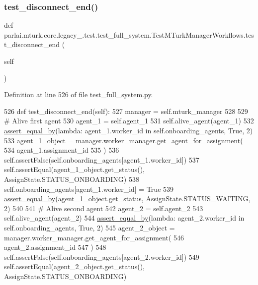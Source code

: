 \subsubsection{\texorpdfstring{test\+\_\+disconnect\+\_\+end()}{test\_disconnect\_end()}}
{\footnotesize\ttfamily def parlai.\+mturk.\+core.\+legacy\+\_.\+test.\+test\+\_\+full\+\_\+system.\+Test\+M\+Turk\+Manager\+Workflows.\+test\+\_\+disconnect\+\_\+end (\begin{DoxyParamCaption}\item[{}]{self }\end{DoxyParamCaption})}



Definition at line 526 of file test\+\_\+full\+\_\+system.\+py.


\begin{DoxyCode}
526     \textcolor{keyword}{def }test\_disconnect\_end(self):
527         manager = self.mturk\_manager
528 
529         \textcolor{comment}{# Alive first agent}
530         agent\_1 = self.agent\_1
531         self.alive\_agent(agent\_1)
532         \hyperlink{namespaceparlai_1_1mturk_1_1core_1_1test_1_1test__full__system_a0b463246d35658a2e422010f13dcf819}{assert\_equal\_by}(\textcolor{keyword}{lambda}: agent\_1.worker\_id \textcolor{keywordflow}{in} self.onboarding\_agents, \textcolor{keyword}{True}, 2)
533         agent\_1\_object = manager.worker\_manager.get\_agent\_for\_assignment(
534             agent\_1.assignment\_id
535         )
536         self.assertFalse(self.onboarding\_agents[agent\_1.worker\_id])
537         self.assertEqual(agent\_1\_object.get\_status(), AssignState.STATUS\_ONBOARDING)
538         self.onboarding\_agents[agent\_1.worker\_id] = \textcolor{keyword}{True}
539         \hyperlink{namespaceparlai_1_1mturk_1_1core_1_1test_1_1test__full__system_a0b463246d35658a2e422010f13dcf819}{assert\_equal\_by}(agent\_1\_object.get\_status, AssignState.STATUS\_WAITING, 2)
540 
541         \textcolor{comment}{# Alive second agent}
542         agent\_2 = self.agent\_2
543         self.alive\_agent(agent\_2)
544         \hyperlink{namespaceparlai_1_1mturk_1_1core_1_1test_1_1test__full__system_a0b463246d35658a2e422010f13dcf819}{assert\_equal\_by}(\textcolor{keyword}{lambda}: agent\_2.worker\_id \textcolor{keywordflow}{in} self.onboarding\_agents, \textcolor{keyword}{True}, 2)
545         agent\_2\_object = manager.worker\_manager.get\_agent\_for\_assignment(
546             agent\_2.assignment\_id
547         )
548         self.assertFalse(self.onboarding\_agents[agent\_2.worker\_id])
549         self.assertEqual(agent\_2\_object.get\_status(), AssignState.STATUS\_ONBOARDING)

\end{DoxyCode}
